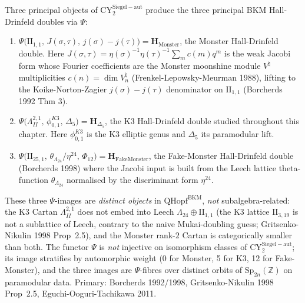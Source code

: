\begin{remark}
\label{rem:k3ebkm-psi-principal-values}
Three principal objects of $\mathrm{CY}^{\mathrm{Siegel-aut}}_2$ produce
the three principal BKM Hall-Drinfeld doubles via $\Psi$:
\begin{enumerate}
\item $\Psi\bigl(\mathrm{II}_{1,1},\, J(\sigma,\tau),\, j(\sigma)-j(\tau)\bigr)
 = \mathbf H_{\mathrm{Monster}}$, the Monster Hall-Drinfeld double.
 Here $J(\sigma,\tau) = \eta(\sigma)^{-1}\eta(\tau)^{-1}\sum_m c(m)q^m$
 is the weak Jacobi form whose Fourier coefficients are the
 Monster moonshine module $V^\natural$ multiplicities $c(n) = \dim V^\natural_n$
 (Frenkel-Lepowsky-Meurman 1988), lifting to the Koike-Norton-Zagier
 $j(\sigma) - j(\tau)$ denominator on $\mathrm{II}_{1,1}$
 (Borcherds 1992 Thm 3).
\item $\Psi\bigl(\Lambda^{2,1}_{II},\, \phi_{0,1}^{K3},\, \Delta_5\bigr)
 = \mathbf H_{\Delta_5}$, the K3 Hall-Drinfeld double studied
 throughout this chapter. Here $\phi_{0,1}^{K3}$ is the K3
 elliptic genus and $\Delta_5$ its paramodular lift.
\item $\Psi\bigl(\mathrm{II}_{25,1},\, \theta_{\Lambda_{24}}/\eta^{24},\,
 \Phi_{12}\bigr) = \mathbf H_{\mathrm{FakeMonster}}$, the
 Fake-Monster Hall-Drinfeld double (Borcherds 1998) where the Jacobi
 input is built from the Leech lattice theta-function
 $\theta_{\Lambda_{24}}$ normalised by the discriminant form
 $\eta^{24}$.
\end{enumerate}
These three $\Psi$-images are \emph{distinct objects} in
$\mathrm{QHopf}^{\mathrm{BKM}}$, \emph{not} subalgebra-related: the
K3 Cartan $\Lambda^{2,1}_{II}$ does not embed into Leech
$\Lambda_{24}\oplus\mathrm{II}_{1,1}$ (the K3 lattice $\mathrm{II}_{3,19}$
is not a sublattice of Leech, contrary to the naive Mukai-doubling
guess; Gritsenko-Nikulin 1998 Prop~2.5), and the Monster rank-$2$
Cartan is categorically smaller than both. The functor $\Psi$ is
\emph{not} injective on isomorphism classes of $\mathrm{CY}^{\mathrm{Siegel-aut}}_2$;
its image stratifies by automorphic weight (0 for Monster, 5 for K3,
12 for Fake-Monster), and the three images are $\Psi$-fibres over
distinct orbits of $\mathrm{Sp}_{2n}(\mathbb Z)$ on paramodular data.
Primary: Borcherds 1992/1998, Gritsenko-Nikulin 1998 Prop~2.5,
Eguchi-Ooguri-Tachikawa 2011.
\end{remark}

